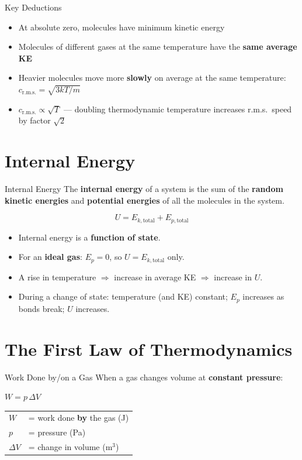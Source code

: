 \begin{keybox}{Key Deductions}
\begin{itemize}[itemsep=3pt]
  \item At absolute zero, molecules have minimum kinetic energy
  \item Molecules of different gases at the same temperature have the \textbf{same average KE}
  \item Heavier molecules move more \textbf{slowly} on average at the same temperature: $c_\text{r.m.s.} = \sqrt{3kT/m}$
  \item $c_\text{r.m.s.} \propto \sqrt{T}$ --- doubling thermodynamic temperature increases r.m.s.\ speed by factor $\sqrt{2}$
\end{itemize}
\end{keybox}

\section{Internal Energy}

\begin{definitionbox}{Internal Energy}
The \textbf{internal energy} of a system is the sum of the \textbf{random kinetic energies} and \textbf{potential energies} of all the molecules in the system.

$$U = E_{k,\text{total}} + E_{p,\text{total}}$$

\begin{itemize}[itemsep=2pt]
  \item Internal energy is a \textbf{function of state}.
  \item For an \textbf{ideal gas}: $E_p = 0$, so $U = E_{k,\text{total}}$ only.
  \item A rise in temperature $\Rightarrow$ increase in average KE $\Rightarrow$ increase in $U$.
  \item During a change of state: temperature (and KE) constant; $E_p$ increases as bonds break; $U$ increases.
\end{itemize}
\end{definitionbox}

\section{The First Law of Thermodynamics}

\begin{formulabox}{Work Done by/on a Gas}
When a gas changes volume at \textbf{constant pressure}:
\begin{center}
\Large $W = p\,\Delta V$
\end{center}
\vspace{0.3em}
\begin{tabular}{@{}ll@{}}
$W$ & = work done \textbf{by} the gas (J) \\
$p$ & = pressure (Pa) \\
$\Delta V$ & = change in volume (m$^3$) \\
\end{tabular}
\end{formulabox}


